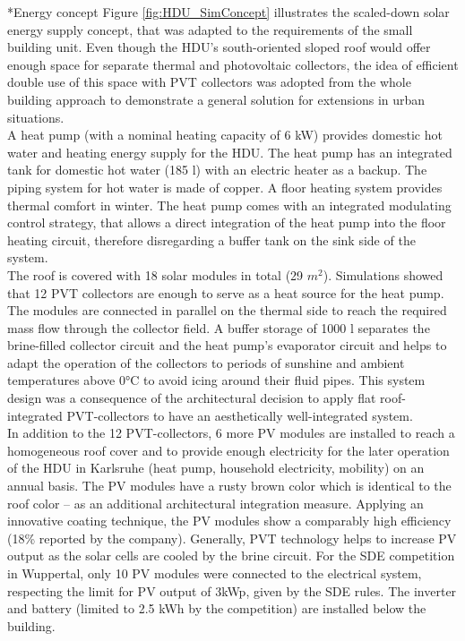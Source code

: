 \documentclass[twocolumn, a4paper,10pt]{article}
\makeatletter
\renewcommand\subsection{\@startsection{subsection}{1}{\z@}{\z@}{\z@}{\normalfont\normalsize\bfseries}}
\renewcommand\subsection{\@startsection{subsection}{1}{\z@}{\z@}{0.1pt}{\normalfont\normalsize\bfseries}}
\makeatother
\begin{document}
\subsection*{Energy concept}
Figure \ref{fig:HDU_SimConcept} illustrates the scaled-down solar energy supply concept, that was adapted to the requirements of the small building unit. Even though the HDU's south-oriented sloped roof would offer enough space for separate thermal and photovoltaic collectors, the idea of efficient double use of this space with PVT collectors was adopted from the whole building approach to demonstrate a general solution for extensions in urban situations.\\ 
A heat pump (with a nominal heating capacity of 6 kW) provides domestic hot water and heating energy supply for the HDU. The heat pump has an integrated tank for domestic hot water (185 l) with an electric heater as a backup. The piping system for hot water is made of copper. A floor heating system provides thermal comfort in winter. The heat pump comes with an integrated modulating control strategy, that allows a direct integration of the heat pump into the floor heating circuit, therefore disregarding a buffer tank on the sink side of the system.\\
The roof is covered with 18 solar modules in total (29 $m^2$). Simulations showed that 12 PVT collectors are enough to serve as a heat source for the heat pump. The modules are connected in parallel on the thermal side to reach the required mass flow through the collector field. A buffer storage of 1000 l separates the brine-filled collector circuit and the heat pump's evaporator circuit and helps to adapt the operation of the collectors to periods of sunshine and ambient temperatures above 0°C to avoid icing around their fluid pipes. This system design was a consequence of the architectural decision to apply flat roof-integrated PVT-collectors to have an aesthetically well-integrated system.\\
In addition to the 12 PVT-collectors, 6 more PV modules are installed to reach a homogeneous roof cover and to provide enough electricity for the later operation of the HDU in Karlsruhe (heat pump, household electricity, mobility) on an annual basis. The PV modules have a rusty brown color which is identical to the roof color – as an additional architectural integration measure. Applying an innovative coating technique, the PV modules show a comparably high efficiency (18\% reported by the company). Generally, PVT technology helps to increase PV output as the solar cells are cooled by the brine circuit. For the SDE competition in Wuppertal, only 10 PV modules were connected to the electrical system, respecting the limit for PV output of 3kWp, given by the SDE rules. The inverter and battery (limited to 2.5 kWh by the competition) are installed below the building.\\
\end{document}
